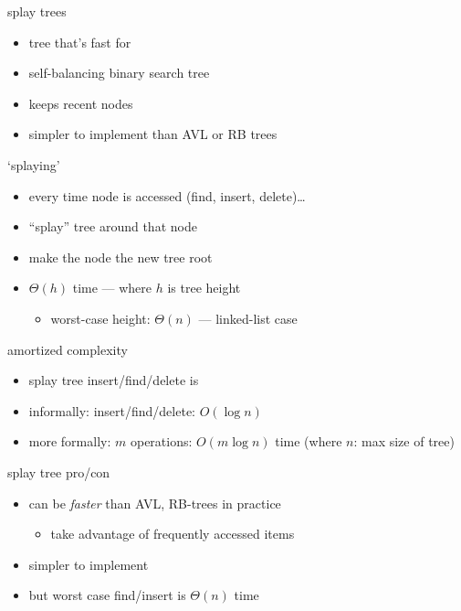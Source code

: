 \begin{frame}{splay trees}
    \begin{itemize}
    \item tree that's fast for 
    \item self-balancing binary search tree
    \item keeps recent nodes 
    \vspace{.5cm}
    \item simpler to implement than AVL or RB trees
    \end{itemize}
\end{frame}

\begin{frame}{`splaying'}
    \begin{itemize}
    \item every time node is accessed (find, insert, delete)\ldots
    \vspace{.5cm}
    \item ``splay'' tree around that node
    \item make the node the new tree root
    \vspace{.5cm}
    \item<2-> $\Theta(h)$ time --- where $h$ is tree height
        \begin{itemize}
            \item<3-> worst-case height: $\Theta(n)$ --- linked-list case
        \end{itemize}
    \end{itemize}
\end{frame}

\begin{frame}{amortized complexity}
    \begin{itemize}
        \item splay tree insert/find/delete is 
        \item informally:  insert/find/delete: $O(\log n)$
        \item more formally: $m$ operations: $O(m \log n)$ time (where $n$: max size of tree)
    \end{itemize}
\end{frame}

\begin{frame}{splay tree pro/con}
    \begin{itemize}
    \item can be \textit{faster} than AVL, RB-trees in practice
        \begin{itemize}
        \item take advantage of frequently accessed items
        \end{itemize}
    \item simpler to implement
        \vspace{.5cm}
    \item but worst case find/insert is $\Theta(n)$ time
    \end{itemize}
\end{frame}
